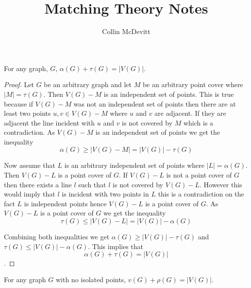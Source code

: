 \documentclass[12pt]{article}
\newenvironment{lemma}[2][Lemma]{\begin{trivlist}
\item[\hskip \labelsep {\bfseries #1}\hskip \labelsep {\bfseries #2.}]}{\end{trivlist}}
\begin{document}
\date{}


\title{Matching Theory Notes}
\author{Collin McDevitt}

\maketitle

\begin{lemma}{1.0.1}
    For any graph, $G$, $\alpha (G)+\tau(G)=|V(G)|$.
\end{lemma}

\begin{proof}
    Let $G$ be an arbitrary graph and let $M$ be an arbitrary point cover where $|M|=\tau(G)$.
    Then $V(G)-M$ is an independent set of points. This is true because if $V(G)-M$ was not an independent set of points then
    there are at least two points $u,v \in V(G)-M$ where $u$ and $v$ are adjacent. If they are adjacent the line incident with $u$ and $v$ is not covered by $M$ which is a contradiction.
    As $V(G)-M$ is an independent set of points we get the inequality $$\alpha(G) \geq |V(G)-M|= |V(G)|-\tau (G)$$

    Now assume that $L$ is an arbitrary independent set of points where $|L|=\alpha(G)$. Then $V(G)-L$ is a point cover of $G$. If $V(G)-L$ is not a point cover of $G$ then there exists a line $l$ such that $l$ is not covered by $V(G)-L$. However this would imply that $l$ is incident with two points in $L$ this is a contradiction on the fact $L$ is independent points hence $V(G)-L$ is a point cover of $G$. As $V(G)-L$ is a point cover of $G$ we get
    the inequality $$\tau(G) \leq |V(G)-L|=|V(G)|-\alpha(G)$$

    Combining both inequalities we get $\alpha(G) \geq |V(G)|-\tau(G)$ and $\tau(G) \leq |V(G)|-\alpha(G)$. This implies that $$\alpha(G)+\tau(G)=|V(G)|$$.
\end{proof}

\begin{lemma}{1.0.2}
    For any graph $G$ with no isolated points, $v(G)+\rho(G)=|V(G)|$.

\end{lemma}
\end{document}
